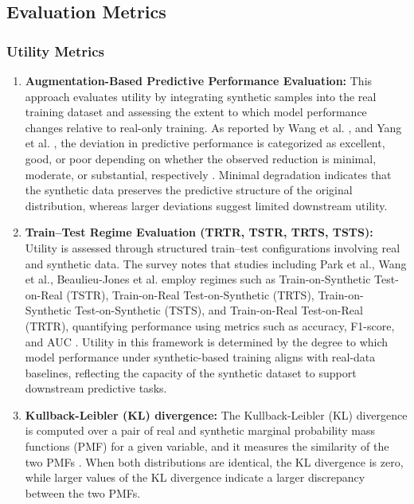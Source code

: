 \documentclass[master,proposal,extern,palatino]{rgseThesis}
\begin{document}
\subsection{Evaluation Metrics}
\subsubsection{Utility Metrics}
\begin{enumerate}
    \item \textbf{Augmentation-Based Predictive Performance Evaluation:} This approach evaluates utility by integrating synthetic samples into the real training dataset and assessing the extent to which model performance changes relative to real-only training. As reported by Wang et al. \cite{wang2019continuous}, and Yang et al. \cite{yang2019grouped}, the deviation in predictive performance is categorized as excellent, good, or poor depending on whether the observed reduction is minimal, moderate, or substantial, respectively\cite{hernandez2022synthetic} . Minimal degradation indicates that the synthetic data preserves the predictive structure of the original distribution, whereas larger deviations suggest limited downstream utility.
    \item \textbf{Train–Test Regime Evaluation (TRTR, TSTR, TRTS, TSTS):} Utility is assessed through structured train–test configurations involving real and synthetic data. The survey notes that studies including Park et al.\cite{park2018data}, Wang et al.\cite{wang2019continuous}, Beaulieu-Jones et al.\cite{beaulieu2019privacy} employ regimes such as Train-on-Synthetic Test-on-Real (TSTR), Train-on-Real Test-on-Synthetic (TRTS), Train-on-Synthetic Test-on-Synthetic (TSTS), and Train-on-Real Test-on-Real (TRTR), quantifying performance using metrics such as accuracy, F1-score, and AUC \cite{hernandez2022synthetic}. Utility in this framework is determined by the degree to which model performance under synthetic-based training aligns with real-data baselines, reflecting the capacity of the synthetic dataset to support downstream predictive tasks.
    \item \textbf{Kullback-Leibler (KL) divergence:} The Kullback-Leibler (KL) divergence is computed over a pair of real and synthetic marginal probability mass functions (PMF) for a given variable, and it measures the similarity of the two PMFs \cite{goncalves2020generation}. When both distributions are identical, the KL divergence is zero, while larger values of the KL divergence indicate a larger discrepancy between the two PMFs.

\end{enumerate}
\end{document}
